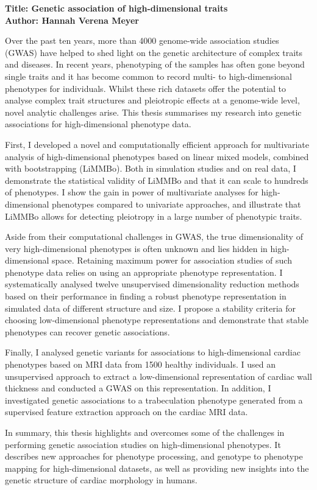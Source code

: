 \documentclass{thesis}
\begin{document}
\noindent\textbf{Title: Genetic association of high-dimensional traits}
\\
\textbf{Author: Hannah Verena Meyer}
\\
\begin{singlespace}
Over the past ten years, more than \num{4000} genome-wide association studies (GWAS) have helped to shed light on the genetic architecture of complex traits and diseases. In recent years, phenotyping of the samples has often gone beyond single traits and it has become common to record multi- to high-dimensional phenotypes for individuals. Whilst these rich datasets offer the potential to analyse complex trait structures and pleiotropic effects at a genome-wide level, novel analytic challenges arise. This thesis summarises my research into genetic associations for high-dimensional phenotype data.

First, I developed a novel and computationally efficient approach for multivariate analysis of high-dimensional phenotypes based on linear mixed models, combined with bootstrapping (LiMMBo). Both in simulation studies and on real data, I demonstrate the statistical validity of LiMMBo and that it can scale to hundreds of phenotypes. I show the gain in power of multivariate analyses for high-dimensional phenotypes compared to univariate approaches, and illustrate that LiMMBo allows for detecting pleiotropy in a large number of phenotypic traits.

Aside from their computational challenges in GWAS, the true dimensionality of very high-dimensional phenotypes is often unknown and lies hidden in high- dimensional space. Retaining maximum power for association studies of such phenotype data relies on using an appropriate phenotype representation. I systematically analysed twelve unsupervised dimensionality reduction methods based on their performance in finding a robust phenotype representation in simulated data of different structure and size. I propose a stability criteria for choosing low-dimensional phenotype representations and demonstrate that stable phenotypes can recover genetic associations.

Finally, I analysed genetic variants for associations to high-dimensional cardiac phenotypes based on MRI data from \num{1500} healthy individuals. I used an unsupervised approach to extract a low-dimensional representation of cardiac wall thickness and conducted a GWAS on this representation. In addition, I investigated genetic associations to a trabeculation phenotype generated from a supervised feature extraction approach on the cardiac MRI data.

In summary, this thesis highlights and overcomes some of the challenges in performing genetic association studies on high-dimensional phenotypes. It describes new approaches for phenotype processing, and genotype to phenotype mapping for high-dimensional datasets, as well as providing new insights into the genetic structure of cardiac morphology in humans.
\end{singlespace}
\end{document}
